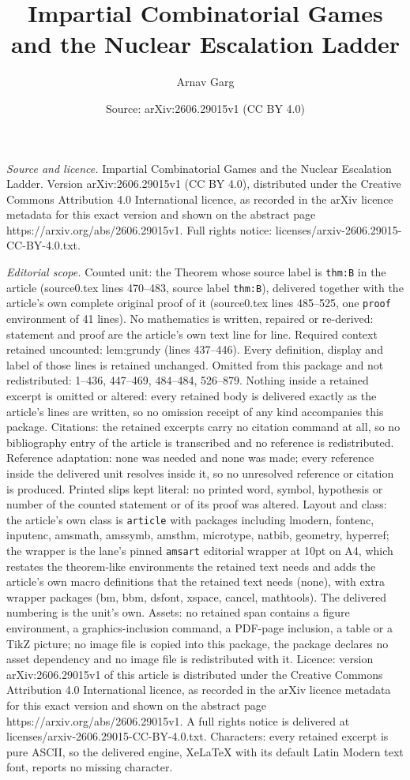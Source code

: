 \documentclass[10pt,a4paper]{amsart}
\title[Impartial Combinatorial Games and the Nuclear Escalation Lad]{Impartial Combinatorial Games and the Nuclear Escalation Ladder}
\author{Arnav Garg}
\date{Source: arXiv:2606.29015v1 (CC BY 4.0)}
\begin{document}
\maketitle

\noindent\emph{Source and licence.} Impartial Combinatorial Games and the Nuclear Escalation Ladder. Version arXiv:2606.29015v1 (CC BY 4.0), distributed under the Creative Commons Attribution 4.0 International licence, as recorded in the arXiv licence metadata for this exact version and shown on the abstract page https://arxiv.org/abs/2606.29015v1. Full rights notice: licenses/arxiv-2606.29015-CC-BY-4.0.txt.\par\smallskip

\noindent\textit{Editorial scope.} Counted unit: the Theorem whose source label is \texttt{thm:B} in the article (source0.tex lines 470--483, source label \texttt{thm:B}), delivered together with the article's own complete original proof of it (source0.tex lines 485--525, one \texttt{proof} environment of 41 lines). No mathematics is written, repaired or re-derived: statement and proof are the article's own text line for line. Required context retained uncounted: lem:grundy (lines 437--446). Every definition, display and label of those lines is retained unchanged. Omitted from this package and not redistributed: 1--436, 447--469, 484--484, 526--879. Nothing inside a retained excerpt is omitted or altered: every retained body is delivered exactly as the article's lines are written, so no omission receipt of any kind accompanies this package. Citations: the retained excerpts carry no citation command at all, so no bibliography entry of the article is transcribed and no reference is redistributed. Reference adaptation: none was needed and none was made; every reference inside the delivered unit resolves inside it, so no unresolved reference or citation is produced. Printed slips kept literal: no printed word, symbol, hypothesis or number of the counted statement or of its proof was altered. Layout and class: the article's own class is \texttt{article} with packages including lmodern, fontenc, inputenc, amsmath, amssymb, amsthm, microtype, natbib, geometry, hyperref; the wrapper is the lane's pinned \texttt{amsart} editorial wrapper at 10pt on A4, which restates the theorem-like environments the retained text needs and adds the article's own macro definitions that the retained text needs (none), with extra wrapper packages (bm, bbm, dsfont, xspace, cancel, mathtools). The delivered numbering is the unit's own. Assets: no retained span contains a figure environment, a graphics-inclusion command, a PDF-page inclusion, a table or a TikZ picture; no image file is copied into this package, the package declares no asset dependency and no image file is redistributed with it. Licence: version arXiv:2606.29015v1 of this article is distributed under the Creative Commons Attribution 4.0 International licence, as recorded in the arXiv licence metadata for this exact version and shown on the abstract page https://arxiv.org/abs/2606.29015v1. A full rights notice is delivered at licenses/arxiv-2606.29015-CC-BY-4.0.txt. Characters: every retained excerpt is pure ASCII, so the delivered engine, XeLaTeX with its default Latin Modern text font, reports no missing character.
\end{document}
